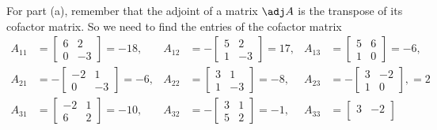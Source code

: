 \begin{questions}
  \begin{solution}
    For part (a), remember that the adjoint of a matrix $\adj A$ is the
    transpose of its cofactor matrix. So we need to find the entries of the
    cofactor matrix
    \begin{align*}
      A_{11}&=
      \begin{bmatrix}
        6&2\\0&-3
      \end{bmatrix}=-18,
      &A_{12}&=
      -\begin{bmatrix}
        5&2\\
        1&-3
      \end{bmatrix}=17,
      &A_{13}&=
      \begin{bmatrix}
        5&6\\
        1&0
      \end{bmatrix}=-6,\\
      A_{21}&=
      -\begin{bmatrix}
        -2&1\\
        0&-3
      \end{bmatrix}=-6,
      &A_{22}&=
      \begin{bmatrix}
        3&1\\
        1&-3
      \end{bmatrix}=-8,
      &A_{23}&=
      -\begin{bmatrix}
        3&-2\\
        1&0
      \end{bmatrix},=2\\
      A_{31}&=
      \begin{bmatrix}
        -2&1\\
        6&2
      \end{bmatrix}=-10,
      &A_{32}&=
      -\begin{bmatrix}
        3&1\\
        5&2
      \end{bmatrix}=-1,
      &A_{33}&=
      \begin{bmatrix}
        3&-2\\

\end{bmatrix}
\end{align*}
\end{solution}
\end{questions}
